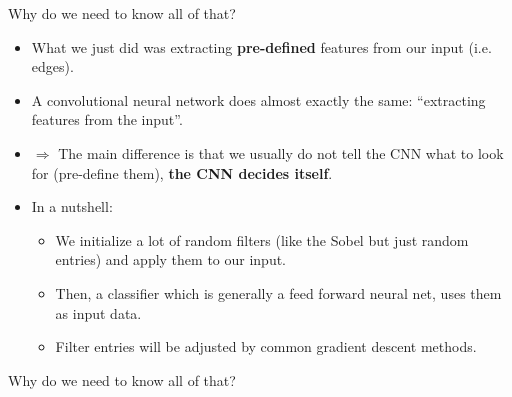 \begin{vbframe}{Why do we need to know all of that?}
  \begin{itemize}
    \item What we just did was extracting \textbf{pre-defined} features from our input (i.e. edges).
    \item A convolutional neural network does almost exactly the same: \enquote{extracting features from the input}.
    \item[] $\Rightarrow$ The main difference is that we usually do not tell the CNN what to look for (pre-define them), \textbf{the CNN decides itself}.
    \item In a nutshell:
    \begin{itemize}
      \item We initialize a lot of random filters (like the Sobel but just random entries) and apply them to our input.
      \item Then, a classifier which is generally a feed forward neural net, uses them as input data.
      \item Filter entries will be adjusted by common gradient descent methods.
    \end{itemize}
  \end{itemize}
\end{vbframe}

\begin{frame}{Why do we need to know all of that?}
\center
{}
\end{frame}

